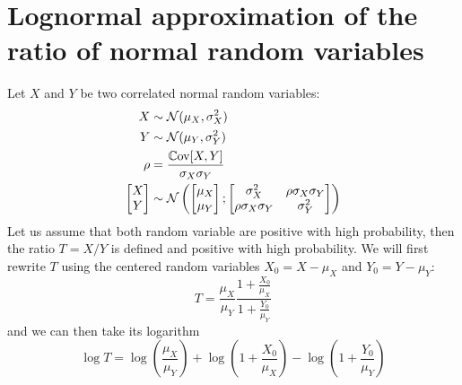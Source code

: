 \documentclass[../../Main_ManuscritThese.tex]{subfiles}
\begin{document}
  \section{Lognormal approximation of the ratio of normal random variables}
  \label{sec:lognorm_ratio}
  Let $X$ and $Y$ be two correlated normal random variables:
  \begin{align}
    X &\sim \mathcal{N}(\mu_X, \sigma^2_X) \\
    Y &\sim \mathcal{N}(\mu_Y, \sigma^2_Y) \\
    \rho &= \frac{\Cov[X,Y]}{\sigma_X \sigma_Y} \\
    \begin{bmatrix}
      X \\ Y
    \end{bmatrix} &\sim \mathcal{N}\left(%
    \begin{bmatrix}
      \mu_X \\ \mu_Y
    \end{bmatrix};%
    \begin{bmatrix}
      \sigma^2_X  & \rho \sigma_X \sigma_Y \\
      \rho\sigma_X \sigma_Y & \sigma^2_Y
    \end{bmatrix} \right)
  \end{align}
  Let us assume that both random variable are positive with high probability, then the ratio $T=X/Y$ is defined and positive with high probability. We will first rewrite $T$ using the centered random variables $X_0=X-\mu_X$ and $Y_0 = Y-\mu_Y$:
  \begin{equation}
    T = \frac{\mu_X}{\mu_Y}\frac{1 + \frac{X_0}{\mu_X}}{1 + \frac{Y_0}{\mu_Y}}
  \end{equation}
  and we can then take its logarithm
  \begin{equation}
    \log T = \log\left(\frac{\mu_X}{\mu_Y}\right) + \log\left(1 + \frac{X_0}{\mu_X}\right) -\log\left(1 + \frac{Y_0}{\mu_Y}\right)
  \end{equation}
  
\end{document}
